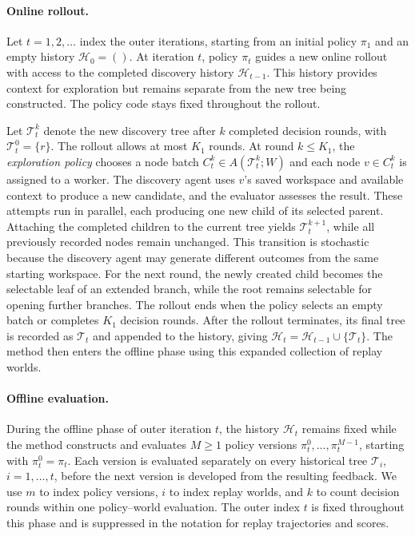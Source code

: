 \paragraph{Online rollout.}
Let \(t=1,2,\ldots\) index the outer iterations, starting from an
initial policy \(\pi_1\) and an empty history \(\mathcal H_0=()\).
At iteration \(t\), policy \(\pi_t\) guides a new online rollout
with access to the completed discovery history \(\mathcal H_{t-1}\).
This history provides context for exploration but remains separate
from the new tree being constructed. The policy code stays fixed
throughout the rollout.

Let \(\mathcal T_{t}^k\) denote the new discovery tree after \(k\)
completed decision rounds, with \(\mathcal T_{t}^0=\{r\}\).
The rollout allows at most \(K_1\) rounds. At round $k \le K_1$, the \emph{exploration policy} chooses a node batch \(C_{t}^k \in A(\mathcal T_{t}^k;W)\) and each node \(v\in C_{t}^k\) is assigned to a worker.
The discovery agent uses \(v\)'s saved workspace and available
context to produce a new candidate, and the evaluator assesses
the result. These attempts run in parallel, each producing one
new child of its selected parent. Attaching the completed children
to the current tree yields \(\mathcal T_{t}^{k+1}\), while all
previously recorded nodes remain unchanged. This transition is stochastic because the discovery agent may
generate different outcomes from the same starting workspace. For the next round, the newly created
child becomes the selectable leaf of an extended branch, while the root remains selectable for opening further branches. The rollout ends when the policy selects an empty batch or completes \(K_1\) decision rounds. After the rollout terminates, its final tree is recorded as
\(\mathcal T_t\) and appended to the history, giving
\(\mathcal H_t= \mathcal H_{t-1} \cup \{\mathcal{T}_t\}\).
The method then enters the offline phase using this expanded collection of replay worlds.

\paragraph{Offline evaluation.}
During the offline phase of outer iteration \(t\), the history
\(\mathcal H_t\) remains fixed while the method constructs and
evaluates \(M\geq 1\) policy versions
\(\pi_t^0,\ldots,\pi_t^{M-1}\), starting with
\(\pi_t^0=\pi_t\).
Each version is evaluated separately on every historical tree
\(\mathcal T_i\), \(i=1,\ldots,t\), before the next version is
developed from the resulting feedback.
We use \(m\) to index policy versions, \(i\) to index replay worlds, and \(k\) to count decision rounds within one policy--world
evaluation. The outer index \(t\) is fixed throughout this phase
and is suppressed in the notation for replay trajectories and scores.



